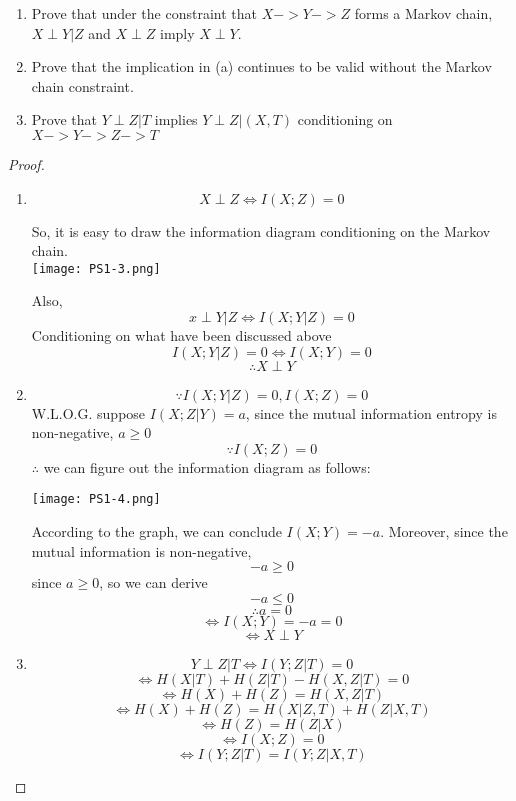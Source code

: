 \documentclass[12pt]{article}
\newenvironment{problem}[2][Problem]{\begin{trivlist}
\item[\hskip \labelsep {\bfseries #1}\hskip \labelsep {\bfseries #2.}]}{\end{trivlist}}
\begin{document}
\begin{problem}{7 Implication and Markov Chain}
    \quad\quad\quad
    \begin{enumerate}[label=\alph*)]
        \item 
        Prove that under the constraint that $X->Y->Z$ forms a Markov chain,  $X\perp Y|Z$ and $X\perp Z$ imply $X\perp Y$.
        \item
        Prove that the implication in (a) continues to be valid without the Markov chain constraint.
        \item
        Prove that $Y\perp Z|T$ implies $Y\perp Z|(X,T)$ conditioning on $X->Y->Z->T$
    \end{enumerate}
\end{problem}

\begin{proof}
    \begin{enumerate}[label=\alph*]
        \item
        $$X\perp Z \Longleftrightarrow I(X;Z)=0$$
        \begin{center}
        So, it is easy to draw the information diagram conditioning on the Markov chain. \\
        \texttt{[image: PS1-3.png]}\\
        \end{center}
        Also,
        $$x\perp Y\big| Z \Longleftrightarrow I(X;Y|Z)=0$$
        Conditioning on what have been discussed above
        $$I(X;Y|Z)=0\Longleftrightarrow I(X;Y)=0$$
        $$\therefore X\perp Y$$
        \item 
        $$\because I(X;Y\big|Z)=0, I(X;Z)=0$$
        W.L.O.G. suppose $I(X;Z|Y)=a$, since the mutual information entropy is non-negative, $a\geq0$
        $$\because I(X;Z)=0 $$
        $\therefore $
        we can figure out the information diagram as follows:
        \begin{center}
            \texttt{[image: PS1-4.png]}
        \end{center}
        According to the graph, we can conclude $I(X;Y)=-a$. Moreover, since the mutual information is non-negative, $$-a\geq0$$
        since $a\geq0$, so we can derive
        $$-a\leq0$$
        $$\therefore a=0$$
        $$\Longleftrightarrow I(X;Y)=-a=0$$
        $$\Longleftrightarrow X\perp Y$$
        \item
        $$Y\perp Z\big| T \Leftrightarrow I(Y;Z|T)=0$$
        $$\Leftrightarrow H(X|T)+H(Z|T)-H(X,Z|T)=0$$
        $$\Leftrightarrow H(X)+H(Z)=H(X,Z|T)$$
        $$\Leftrightarrow H(X)+H(Z)=H(X|Z,T)+H(Z|X,T)$$
        $$\Leftrightarrow H(Z)=H(Z|X)$$
        $$\Leftrightarrow I(X;Z)=0$$
        $$\Leftrightarrow I(Y;Z|T)=I(Y;Z|X,T)$$
    \end{enumerate}
\end{proof}
\end{document}
